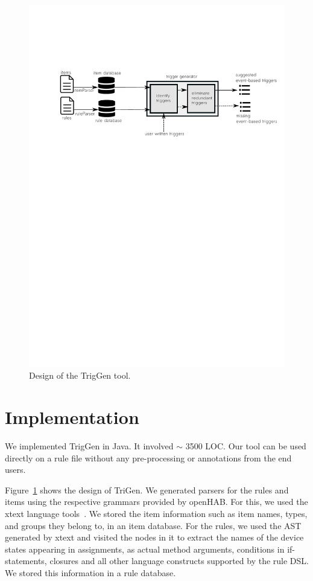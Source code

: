 \documentclass{sig-alternate-05-2015}
\begin{document}
\begin{figure}
\centering
\includegraphics [trim=0cm 18cm 0 5cm, scale=0.8]{images/design.pdf}
\caption{Design of the TrigGen tool.}
\label{fig:design}
\end{figure} 

\section{Implementation}
We implemented TrigGen in Java. It involved $\sim$ 3500 LOC. Our tool can be used directly on a rule file without any pre-processing or annotations from the end users. 

Figure~\ref{fig:design} shows the design of TriGen. We generated parsers for the rules and items using the respective grammars provided by openHAB. For this, we used the xtext language tools~\cite{xtext}. We stored the item information such as item names, types, and groups they belong to, in an item database. For the rules, we used the AST generated by xtext and visited the nodes in it to extract the names of the device states appearing in assignments, as actual method arguments, conditions in if-statements, closures and all other language constructs supported by the rule DSL. We stored this information in a rule database. 
\end{document}
